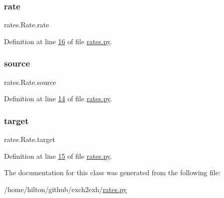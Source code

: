 \subsubsection{\texorpdfstring{rate}{rate}}
{\footnotesize\ttfamily rates.\+Rate.\+rate}



Definition at line \hyperlink{rates_8py_source_l00016}{16} of file \hyperlink{rates_8py_source}{rates.\+py}.

\mbox{\label{classrates_1_1_rate_a82a6abb7536f2a4393f43456cfb1dc5e}} 
\subsubsection{\texorpdfstring{source}{source}}
{\footnotesize\ttfamily rates.\+Rate.\+source}



Definition at line \hyperlink{rates_8py_source_l00014}{14} of file \hyperlink{rates_8py_source}{rates.\+py}.

\mbox{\label{classrates_1_1_rate_adb1bbb0977c838106cb181a5941612c8}} 
\subsubsection{\texorpdfstring{target}{target}}
{\footnotesize\ttfamily rates.\+Rate.\+target}



Definition at line \hyperlink{rates_8py_source_l00015}{15} of file \hyperlink{rates_8py_source}{rates.\+py}.



The documentation for this class was generated from the following file\+:\begin{DoxyCompactItemize}
\item 
/home/hilton/github/exch2exh/\hyperlink{rates_8py}{rates.\+py}\end{DoxyCompactItemize}
